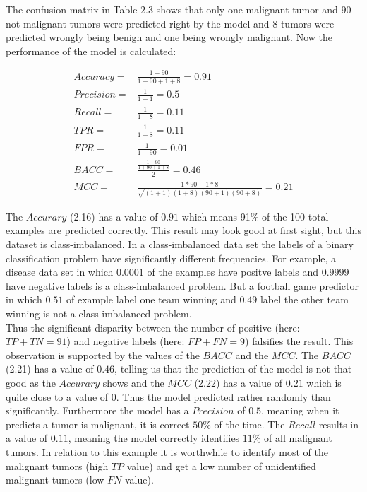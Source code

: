 \begin{exmp}
The confusion matrix in Table 2.3 shows that only one malignant tumor and $90$ not malignant tumors were predicted right by the model and $8$ tumors were predicted wrongly being benign and one being wrongly malignant. Now the performance of the model is calculated:

\begin{align}
Accuracy   = & \frac{1+90}{1+90+1+8}  = 0.91\\
Precision  = & \frac{1}{1+1}  = 0.5\\
Recall     = & \frac{1}{1+8}  = 0.11\\
TPR        = & \frac{1}{1+8} = 0.11 \\
FPR        = &  \frac{1}{1+90}  = 0.01  \\
BACC       = & \frac{\frac{1+90}{1+90+1+8}}{2} = 0.46  \\
MCC        = & \frac{1*90-1*8}{\sqrt{(1+1)(1+8)(90+1)(90+8)}}  = 0.21
\end{align}


The $Accurary$ (2.16) has a value of $0.91$ which means 91\% of the 100 total examples are predicted correctly. This result may look good at first sight, but this dataset is class-imbalanced. In a class-imbalanced data set the labels of a binary classification problem have significantly different frequencies. For example, a disease data set in which $0.0001$ of the examples have positve labels and $0.9999$ have negative labels is a class-imbalanced problem. But a football game predictor in which $0.51$ of example label one team winning and $0.49$ label the other team winning is not a class-imbalanced problem.\\
Thus the significant disparity between the number of positive (here: $TP+TN=91$) and negative labels (here: $FP+FN=9$) falsifies the result. This observation is supported by the values of the $BACC$ and the $MCC$. The $BACC$ (2.21) has a value of $0.46$, telling us that the prediction of the model is not that good as the $Accurary$ shows and the $MCC$ (2.22) has a value of $0.21$ which is quite close to a value of $0$. Thus the model predicted rather randomly than significantly. Furthermore the model has a $Precision$ of $0.5$, meaning when it predicts a tumor is malignant, it is correct $50\% $ of the time. The $Recall$ results in a value of $0.11$, meaning the model correctly identifies $11\%$ of all malignant tumors. In relation to this example it is worthwhile to identify most of the malignant tumors (high $TP$ value) and get a low number of unidentified malignant tumors (low $FN$ value). 
\end{exmp}


